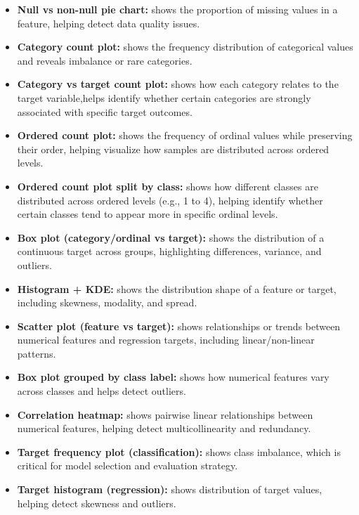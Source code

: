 \begin{itemize}
  \item \textbf{Null vs non-null pie chart:} shows the proportion of missing values in a feature, helping detect data quality issues.

  \item \textbf{Category count plot:} shows the frequency distribution of categorical values and reveals imbalance or rare categories.

  \item \textbf{Category vs target count plot:} shows how each category relates to the target variable,helps identify whether certain categories are strongly associated with specific target outcomes.

  \item \textbf{Ordered count plot:} shows the frequency of ordinal values while preserving their order, helping visualize how samples are distributed across ordered levels.

  \item \textbf{Ordered count plot split by class:} shows how different classes are distributed across ordered levels (e.g., 1 to 4), helping identify whether certain classes tend to appear more in specific ordinal levels.

  \item \textbf{Box plot (category/ordinal vs target):} shows the distribution of a continuous target across groups, highlighting differences, variance, and outliers.

  \item \textbf{Histogram + KDE:} shows the distribution shape of a feature or target, including skewness, modality, and spread.

  \item \textbf{Scatter plot (feature vs target):} shows relationships or trends between numerical features and regression targets, including linear/non-linear patterns.

  \item \textbf{Box plot grouped by class label:} shows how numerical features vary across classes and helps detect outliers.

  \item \textbf{Correlation heatmap:} shows pairwise linear relationships between numerical features, helping detect multicollinearity and redundancy.

  \item \textbf{Target frequency plot (classification):} shows class imbalance, which is critical for model selection and evaluation strategy.

  \item \textbf{Target histogram (regression):} shows distribution of target values, helping detect skewness and outliers.
\end{itemize}
